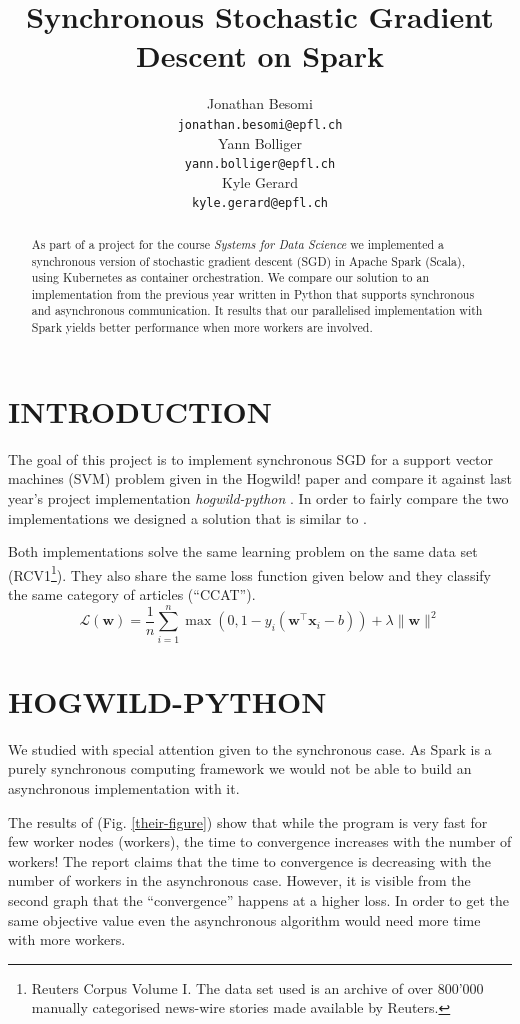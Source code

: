 \documentclass[a4paper, 11pt, conference]{ieeeconf}
\title{\LARGE \bf
Synchronous Stochastic Gradient Descent on Spark
}
\author{ \parbox{2 in}{\centering Jonathan Besomi \\
         {\tt\small jonathan.besomi@epfl.ch}}
         \parbox{2 in}{ \centering Yann Bolliger \\
        {\tt\small yann.bolliger@epfl.ch}}
        \parbox{2 in}{ \centering Kyle Gerard \\
        {\tt\small kyle.gerard@epfl.ch}}
}
\begin{document}
\maketitle
\thispagestyle{empty}
\pagestyle{plain}



\begin{abstract}
As part of a project for the course \textit{Systems for Data Science} we implemented a synchronous version of stochastic gradient descent (SGD) in Apache Spark (Scala), using Kubernetes as container orchestration. We compare our solution to an implementation from the previous year written in Python that supports synchronous and asynchronous communication. It results that our parallelised implementation with Spark yields better performance when more workers are involved. 
\end{abstract}

\section{INTRODUCTION}
The goal of this project is to implement synchronous SGD for a support vector machines (SVM) problem given in the Hogwild! paper \cite{hogwild-paper} and compare it against last year's project implementation \textit{hogwild-python} \cite{hogwild-python}. In order to fairly compare the two implementations we designed a solution that is similar to \cite{hogwild-python}.

Both implementations solve the same learning problem on the same data set (RCV1\footnote{Reuters Corpus Volume I. The data set used is an archive of over 800'000 manually categorised news-wire stories made available by Reuters.}). They also share the same loss function given below and they classify the same category of articles (``CCAT'').
$$
\mathcal{L}(\mathbf{w}) = 
\frac{1}{n} \sum_{i = 1}^{n} 
\max(0, 1- y_i(\mathbf{w}^\top \mathbf{x}_i - b))
+ \lambda \| \mathbf{w} \|^2
$$


\section{HOGWILD-PYTHON} 

We studied \cite{hogwild-python} with special attention given to the  synchronous case. As Spark is a purely synchronous computing framework we would not be able to build an asynchronous implementation with it. 

The results of \cite{hogwild-python} (Fig. \ref{their-figure}) show that while the program is very fast for few worker nodes (workers), the time to convergence increases with the number of workers! The report claims that the time to convergence is decreasing with the number of workers in the asynchronous case. However, it is visible from the second graph that the ``convergence'' happens at a higher loss. In order to get the same objective value even the asynchronous algorithm would need more time with more workers.
\end{document}
